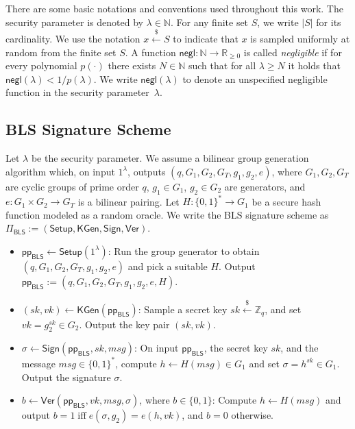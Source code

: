 \documentclass{article}
\newcommand{\ppBLS}[0]{\mathsf{pp}_{\mathsf{BLS}}}
\begin{document}
There are some basic notations and conventions used throughout this work.
The security parameter is denoted by $\lambda \in \mathbb{N}$.
For any finite set $S$, we write $|S|$ for its cardinality. We use the notation $ x \xleftarrow{\$}S$ to indicate that $x$ is sampled uniformly at random from the finite set $S$.
%
A function $\mathsf{negl} : \mathbb{N} \to \mathbb{R}_{\ge 0}$ is called \emph{negligible} if for every polynomial $p(\cdot)$ there exists $N \in \mathbb{N}$ such that for all $\lambda \ge N$ it holds that $\mathsf{negl}(\lambda) < 1/p(\lambda)$. We write $\mathsf{negl}(\lambda)$ to denote an unspecified negligible function in the security parameter~$\lambda$.


\subsection{BLS Signature Scheme}

Let $\lambda$ be the security parameter. We assume a bilinear group
generation algorithm which, on input $1^\lambda$, outputs
 $ (q, G_1, G_2, G_T, g_1, g_2, e)$,
where $G_1,G_2,G_T$ are cyclic groups of prime order $q$, $g_1\in G_1$,
$g_2\in G_2$ are generators, and
$e : G_1 \times G_2 \to G_T$ is a bilinear pairing. Let
$H : \{0,1\}^* \to G_1$ be a secure hash function modeled as a random oracle.
We write the BLS signature scheme as
$
  \Pi_{\mathsf{BLS}} := (\mathsf{Setup}, \mathsf{KGen}, \mathsf{Sign}, \mathsf{Ver}).
$

\begin{itemize}
  \item $\ppBLS \leftarrow \mathsf{Setup}(1^\lambda)$:  
        Run the group generator to obtain
        $(q, G_1, G_2, G_T, g_1, g_2, e)$ and pick a suitable $H$.
        Output 
        $\ppBLS := (q, G_1, G_2, G_T, g_1, g_2, e, H).$

  \item $(sk,vk) \leftarrow \mathsf{KGen}(\ppBLS)$:  
        Sample a secret key $sk \xleftarrow{\$} \mathbb{Z}_q$, and set
        $vk = g_2^{sk} \in G_2.$
        Output the key pair $(sk, vk)$.
  \item $\sigma \leftarrow \mathsf{Sign}(\ppBLS, sk, msg)$:  
        On input $\ppBLS$, the secret key $sk$, and the message $msg \in \{0,1\}^*$, compute
        $h \leftarrow H(msg) \in G_1$ and set
        $\sigma = h^{sk} \in G_1.$
        Output the signature $\sigma$.

  \item $b \leftarrow \mathsf{Ver}(\ppBLS, vk, msg, \sigma)$, where $b \in \{0,1\}$:  
        Compute $h \leftarrow H(msg)$ and output $b = 1\;\text{iff}\;e(\sigma, g_2) = e(h, vk)$, and $b = 0$ otherwise.
\end{itemize}
\end{document}
